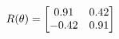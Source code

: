 \documentclass[preview]{standalone}
\begin{document}
\begin{align*}
\special{dvisvgm:raw <g id='unique000'>}R(\theta) = \begin{bmatrix}0.91 & 0.42\\-0.42 & 0.91\end{bmatrix}\special{dvisvgm:raw </g>}
\end{align*}
\end{document}
